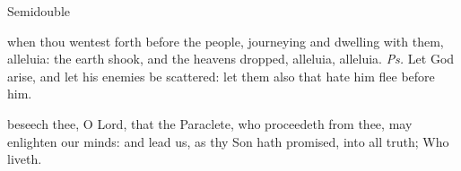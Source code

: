 \begin{inhead}
    {Semidouble}
\end{inhead}
\par\noindent
{}

\introit
{} when thou wentest forth before the people, journeying and dwelling with them, alleluia: the earth shook, and the heavens dropped, alleluia, alleluia. \textit{Ps.} Let God arise, and let his enemies be scattered: let them also that hate him flee before him.

\collect
{} beseech thee, O Lord, that the Paraclete, who proceedeth from thee, may enlighten our minds: and lead us, as thy Son hath promised, into all truth; Who liveth.

